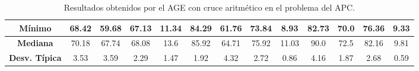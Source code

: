 \documentclass[11pt,a4paper]{article}
\begin{document}
\begin{table}[H]
{\begin{tabular}{c|c|c|c|c|c|c|c|c|c|c|c|c|}
\multicolumn{1}{|c|}{\textbf{Mínimo}}       & 68.42             & 59.68                   & 67.13         & 11.34      & 84.29             & 61.76          & 73.84         & 8.93       & 82.73             & 70.0           & 76.36         & 9.33       \\ \hline
\multicolumn{1}{|c|}{\textbf{Mediana}}      & 70.18             & 67.74                   & 68.08         & 13.6       & 85.92             & 64.71          & 75.92         & 11.03      & 90.0              & 72.5           & 82.16         & 9.81       \\ \hline
\multicolumn{1}{|c|}{\textbf{Desv. Típica}} & 3.53              & 3.59                    & 2.29          & 1.47       & 1.92              & 4.32           & 2.72          & 0.86       & 4.16              & 1.87           & 2.68          & 0.59       \\ \hline
\end{tabular}
}%
\caption{Resultados obtenidos por el AGE con cruce aritmético en el problema del APC.}
\end{table}
\end{document}
